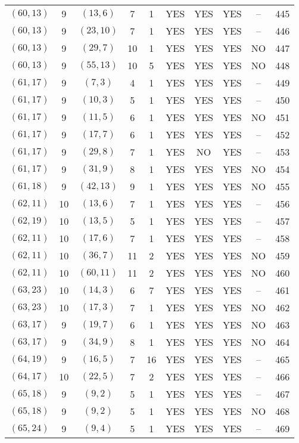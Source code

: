 \begin{longtable}{|c|c|c|c|c|c|c|c|c|c|}
$(60, 13)$ & 9 & $(13, 6)$ & 7 & 1 & YES & YES & YES & -- & 445\\
$(60, 13)$ & 9 & $(23, 10)$ & 7 & 1 & YES & YES & YES & -- & 446\\
$(60, 13)$ & 9 & $(29, 7)$ & 10 & 1 & YES & YES & YES & NO & 447\\
$(60, 13)$ & 9 & $(55, 13)$ & 10 & 5 & YES & YES & YES & NO & 448\\
$(61, 17)$ & 9 & $(7, 3)$ & 4 & 1 & YES & YES & YES & -- & 449\\
$(61, 17)$ & 9 & $(10, 3)$ & 5 & 1 & YES & YES & YES & -- & 450\\
$(61, 17)$ & 9 & $(11, 5)$ & 6 & 1 & YES & YES & YES & NO & 451\\
$(61, 17)$ & 9 & $(17, 7)$ & 6 & 1 & YES & YES & YES & -- & 452\\
$(61, 17)$ & 9 & $(29, 8)$ & 7 & 1 & YES & NO & YES & -- & 453\\
$(61, 17)$ & 9 & $(31, 9)$ & 8 & 1 & YES & YES & YES & NO & 454\\
$(61, 18)$ & 9 & $(42, 13)$ & 9 & 1 & YES & YES & YES & NO & 455\\
$(62, 11)$ & 10 & $(13, 6)$ & 7 & 1 & YES & YES & YES & -- & 456\\
$(62, 19)$ & 10 & $(13, 5)$ & 5 & 1 & YES & YES & YES & -- & 457\\
$(62, 11)$ & 10 & $(17, 6)$ & 7 & 1 & YES & YES & YES & -- & 458\\
$(62, 11)$ & 10 & $(36, 7)$ & 11 & 2 & YES & YES & YES & NO & 459\\
$(62, 11)$ & 10 & $(60, 11)$ & 11 & 2 & YES & YES & YES & NO & 460\\
$(63, 23)$ & 10 & $(14, 3)$ & 6 & 7 & YES & YES & YES & -- & 461\\
$(63, 23)$ & 10 & $(17, 3)$ & 7 & 1 & YES & YES & YES & NO & 462\\
$(63, 17)$ & 9 & $(19, 7)$ & 6 & 1 & YES & YES & YES & NO & 463\\
$(63, 17)$ & 9 & $(34, 9)$ & 8 & 1 & YES & YES & YES & NO & 464\\
$(64, 19)$ & 9 & $(16, 5)$ & 7 & 16 & YES & YES & YES & -- & 465\\
$(64, 17)$ & 10 & $(22, 5)$ & 7 & 2 & YES & YES & YES & -- & 466\\
$(65, 18)$ & 9 & $(9, 2)$ & 5 & 1 & YES & YES & YES & -- & 467\\
$(65, 18)$ & 9 & $(9, 2)$ & 5 & 1 & YES & YES & YES & NO & 468\\
$(65, 24)$ & 9 & $(9, 4)$ & 5 & 1 & YES & YES & YES & -- & 469\\

\end{longtable}
